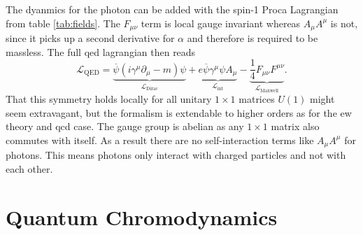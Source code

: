 The dyanmics for the photon can be added with the spin-1 Proca Lagrangian from table \ref{tab:fields}. The $F_{\mu\nu}$ term is local gauge invariant whereas $A_\mu A^\mu$ is not, since it picks up a second derivative for $\alpha$ and therefore is required to be massless. The full \ac{qed} lagrangian then reads
\begin{equation}
    \mathcal{L}_\mathrm{QED}
    =
    \underbrace{\overline{\psi}(i \gamma^\mu \partial_\mu - m )\psi}_{\mathcal{L}_\mathrm{Dirac} }
    +
    \underbrace{ e\overline{\psi} \gamma^\mu {\psi}A_\mu}_{\mathcal{L}_\mathrm{int}}
    -
    \underbrace{\frac{1}{4}F_{\mu\nu}F^{\mu\nu}}_{\mathcal{L}_\mathrm{Maxwell} }.
    \label{eq:l_qed}
\end{equation}
That this symmetry holds locally for all unitary $1\times1$ matrices $U(1)$ might seem extravagant, but the formalism is extendable to higher orders as for the \ac{ew} theory and \ac{qcd} case. The gauge group is abelian as any $1\times1$ matrix also commutes with itself. As a result there are no self-interaction terms like $A_\mu A^\mu$ for photons. This means photons only interact with charged particles and not with each other.

\section{Quantum Chromodynamics}\label{sec:qcd}

